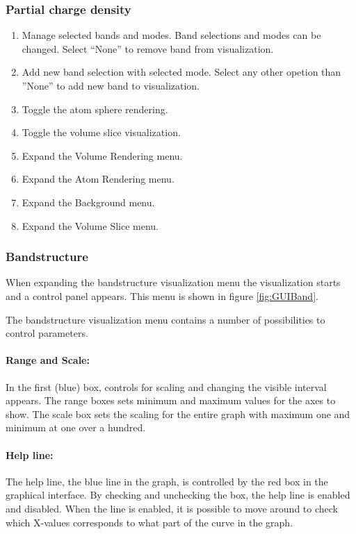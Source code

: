 \subsubsection{Partial charge density}
\begin{enumerate}[label={(\arabic*)}]
  \item Manage selected bands and modes. Band selections and modes can be changed. Select ``None'' to remove band from visualization. 
  \item Add new band selection with selected mode. Select any other opetion than ''None'' to add new band to visualization.
  \item Toggle the atom sphere rendering.
  \item Toggle the volume slice visualization.
  \item Expand the Volume Rendering menu.
  \item Expand the Atom Rendering menu.
  \item Expand the Background menu.
  \item Expand the Volume Slice menu.
\end{enumerate}


\subsubsection{Bandstructure}
When expanding the bandstructure visualization menu the visualization starts and a control panel appears. This menu is shown in figure \ref{fig:GUIBand}.


The bandstructure visualization menu contains a number of possibilities to control parameters.
\paragraph{Range and Scale: }
In the first (blue) box, controls for scaling and changing the visible interval appears. The range boxes sets minimum and maximum values for the axes to show. The scale box sets the scaling for the entire graph with maximum one and minimum at one over a hundred.
\paragraph{Help line: }
The help line, the blue line in the graph, is controlled by the red box in the graphical interface. By checking and unchecking the box, the help line is enabled and disabled. When the line is enabled, it is possible to move around to check which X-values corresponds to what part of the curve in the graph.

